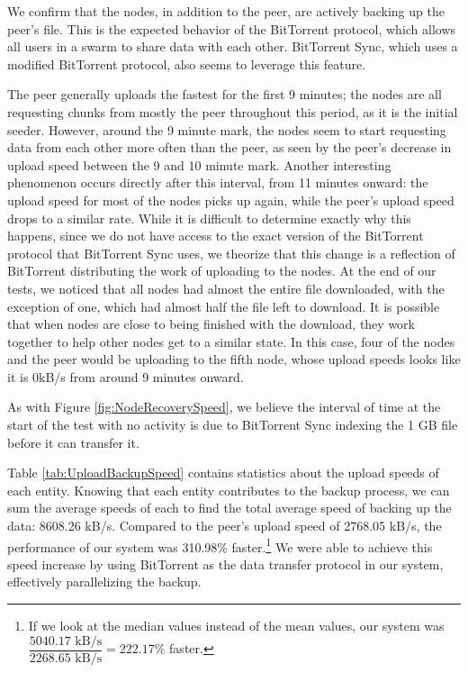 \documentclass[12pt]{report}
\begin{document}
We confirm that the nodes, in addition to the peer, are actively backing up the peer's file. This is the expected behavior of the BitTorrent protocol, which allows all users in a swarm to share data with each other. BitTorrent Sync, which uses a modified BitTorrent protocol, also seems to leverage this feature.

The peer generally uploads the fastest for the first 9 minutes; the nodes are all requesting chunks from mostly the peer throughout this period, as it is the initial seeder. However, around the 9 minute mark, the nodes seem to start requesting data from each other more often than the peer, as seen by the peer's decrease in upload speed between the 9 and 10 minute mark. Another interesting phenomenon occurs directly after this interval, from 11 minutes onward: the upload speed for most of the nodes picks up again, while the peer's upload speed drops to a similar rate. While it is difficult to determine exactly why this happens, since we do not have access to the exact version of the BitTorrent protocol that BitTorrent Sync uses, we theorize that this change is a reflection of BitTorrent distributing the work of uploading to the nodes. At the end of our tests, we noticed that all nodes had almost the entire file downloaded, with the exception of one, which had almost half the file left to download. It is possible that when nodes are close to being finished with the download, they work together to help other nodes get to a similar state. In this case, four of the nodes and the peer would be uploading to the fifth node, whose upload speeds looks like it is 0kB/s from around 9 minutes onward.

As with Figure \ref{fig:NodeRecoverySpeed}, we believe the interval of time at the start of the test with no activity is due to BitTorrent Sync indexing the 1 GB file before it can transfer it.

Table \ref{tab:UploadBackupSpeed} contains statistics about the upload speeds of each entity. Knowing that each entity contributes to the backup process, we can sum the average speeds of each to find the total average speed of backing up the data: 8608.26 kB/s. Compared to the peer's upload speed of 2768.05 kB/s, the performance of our system was 310.98\% faster.\footnote{If we look at the median values instead of the mean values, our system was $\dfrac{5040.17 \text{ kB/s}}{2268.65 \text{ kB/s}} = 222.17\%$ faster.} We were able to achieve this speed increase by using BitTorrent as the data transfer protocol in our system, effectively parallelizing the backup.
\end{document}
